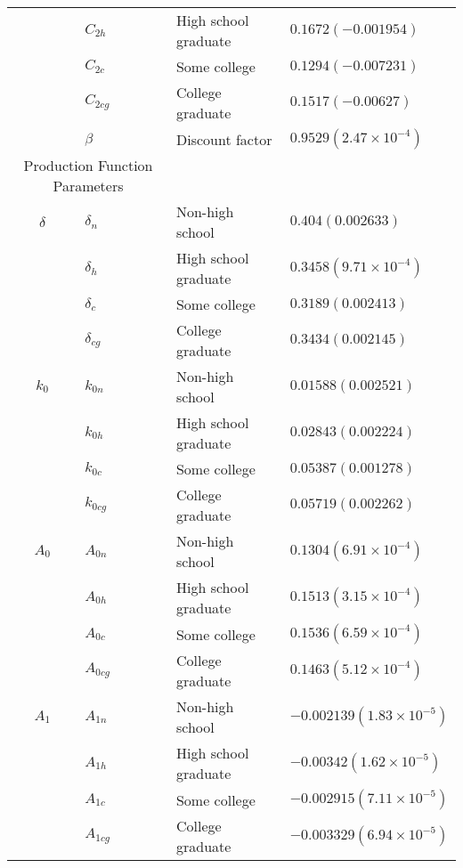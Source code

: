 \documentclass[10pt, letterpaper]{article}
\begin{document}
\begin{center}
\begin{table}
{\begin{tabularx}{1.5\textwidth}{c l l l}
    {} &     $C_{2h} $&  High school graduate  &$0.1672 (-0.001954) $\\
    {} &    $C_{2c} $ &   Some college  & $0.1294 (-0.007231)$\\
    {} &     $C_{2cg} $& College graduate   & $0.1517 (-0.00627)$\\
    {} &    $\beta $ &  Discount factor  & $0.9529 (2.47 \times 10^{-4})$\\
    \multicolumn{2}{c}{Production Function Parameters \footnotemark} & {} & {} \\
    $\delta$ &   $\delta_n $ &   Non-high school  & $0.404 (0.002633) $  \\
    {} &   $ \delta_h $&  High school graduate  &  $0.3458 (9.71 \times 10^{-4}) $ \\
    {} &   $ \delta_c$ &  Some college  &  $ 0.3189 (0.002413)$\\
    {} &   $ \delta_{cg}$&  College graduate  & $0.3434 (0.002145) $ \\

    $k_0$ &   $ k_{0n} $ &   Non-high school  &  $ 0.01588 (0.002521)$\\
    {} &   $ k_{0h} $&  High school graduate  &  $ 0.02843 (0.002224)$\\
    {} &   $ k_{0c}$ &  Some college  &  $0.05387 (0.001278) $\\
    {} &   $ k_{0cg}$&  College graduate  & $ 0.05719 (0.002262)$ \\

    $A_0$ &   $ A_{0n} $ &   Non-high school  & $ 0.1304 (6.91  \times 10^{-4})$ \\
    {} &   $ A_{0h} $&  High school graduate  &  $0.1513 (3.15  \times 10^{-4}) $\\
    {} &   $ A_{0c}$ &  Some college  &  $ 0.1536 (6.59  \times 10^{-4})$\\
    {} &   $ A_{0cg}$&  College graduate  & $0.1463 (5.12  \times 10^{-4}) $ \\
    
    $A_1$ &   $ A_{1n} $ &   Non-high school  & $-0.002139 (1.83  \times 10^{-5}) $ \\
    {} &   $ A_{1h} $&  High school graduate  &  $ -0.00342 (1.62  \times 10^{-5})$\\
    {} &   $ A_{1c}$ &  Some college  &  $-0.002915 (7.11  \times 10^{-5}) $\\
    {} &   $ A_{1cg}$&  College graduate  & $-0.003329 (6.94  \times 10^{-5}) $ \\
    

\end{tabularx}}
\end{table}
\end{center}
\end{document}
